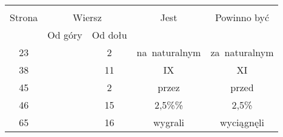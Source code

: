 \documentclass[a4paper,11pt]{article}
\begin{document}
\begin{center}
  \begin{tabular}{|c|c|c|c|c|}
    \hline
    & \multicolumn{2}{c|}{} & & \\
    Strona & \multicolumn{2}{c|}{Wiersz}& Jest & Powinno być \\ \cline{2-3}
    & Od góry & Od dołu &  &  \\ \hline
    23 & &  2 & na~naturalnym & za~naturalnym \\
    38 & & 11 & IX & XI \\
    45 & &  2 & przez & przed \\
    46 & & 15 & 2,5\%\% & 2,5\% \\
    65 & & 16 & wygrali & wyciągnęli \\
    \hline
  \end{tabular}
\end{center}

\vspace{\spaceTwo}







\end{document}

